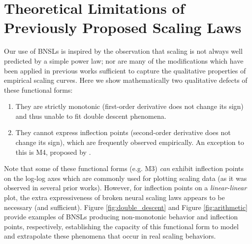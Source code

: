 \documentclass{article} %
\begin{document}
\section{Theoretical Limitations of Previously Proposed Scaling Laws}
\label{section:math_proofs}



Our use of BNSLs is inspired by the observation that scaling is not always well predicted by a simple power law;
nor are many of the modifications which have been applied in previous works sufficient to capture the qualitative properties of empirical scaling curves.  
Here we show mathematically two qualitative defects of these functional forms:
\begin{enumerate}
    \item They are strictly monotonic (first-order derivative does not change its sign) and thus unable to fit double descent phenomena.
    \item They cannot express inflection points (second-order derivative does not change its sign), which are frequently observed empirically.  An exception to this is M4, proposed by \citet{Alabdulmohsi2022revisiting}. %
\end{enumerate}
Note that some of these functional forms (e.g. M3) \textit{can} exhibit inflection points on the log-log axes which are commonly used for plotting scaling data (as it was observed in several prior works).
However, for inflection points on a \textit{linear-linear} plot, the extra expressiveness of broken neural scaling laws appears to be necessary (and sufficient).
Figure \ref{fig:double_descent} and Figure \ref{fig:arithmetic} provide examples of BNSLs producing non-monotonic behavior and inflection points, respectively, establishing the capacity of this functional form to model and extrapolate these phenomena that occur in real scaling behaviors.
\end{document}
